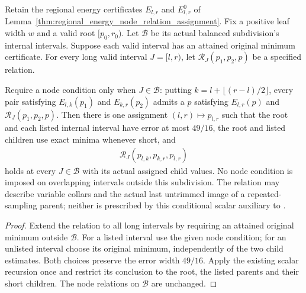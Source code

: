 \begin{lemma}
    \label{lem:root_energy_node_relation_assignment}
    \leanok
    Retain the regional energy certificates $E_{l,r}$ and $E^0_{l,r}$
    of Lemma~\ref{thm:regional_energy_node_relation_assignment}.
    Fix a positive leaf width $w$ and a valid root $[p_0,r_0)$.
    Let $\mathcal B$ be its actual balanced subdivision's internal intervals.
    Suppose each valid interval has an attained original minimum certificate.
    For every long valid interval $J=[l,r)$, let
    $\mathcal R_J(p_1,p_2,p)$ be a specified relation.

    Require a node condition only when $J\in\mathcal B$: putting
    $k=l+\lfloor(r-l)/2\rfloor$, every pair satisfying
    $E_{l,k}(p_1)$ and $E_{k,r}(p_2)$ admits a $p$ satisfying
    $E_{l,r}(p)$ and $\mathcal R_J(p_1,p_2,p)$.
    Then there is one assignment $(l,r)\mapsto p_{l,r}$ such that the
    root and each listed internal interval have error at most $49/16$,
    the root and listed children use exact minima whenever short, and
    \begin{align}
        \mathcal R_J(p_{l,k},p_{k,r},p_{l,r})
    \end{align}
    holds at every $J\in\mathcal B$ with its actual assigned child values.
    No node condition is imposed on overlapping intervals outside this
    subdivision. The relation may describe variable collars and the actual
    last untrimmed image of a repeated-sampling parent; neither is prescribed
    by this conditional scalar auxiliary to
    \cite[Figure~\texttt{fig:algo1}, line 1631, and line 1807]{Arad2016RigorousRG}.
\end{lemma}
\begin{proof}\leanok
    Extend the relation to all long intervals by requiring an attained
    original minimum outside $\mathcal B$. For a listed interval use the
    given node condition; for an unlisted interval choose its original
    minimum, independently of the two child estimates. Both choices preserve
    the error width $49/16$. Apply the existing scalar recursion once and
    restrict its conclusion to the root, the listed parents and their short
    children. The node relations on $\mathcal B$ are unchanged.
\end{proof}
